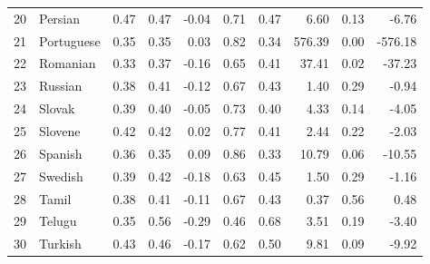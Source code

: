\documentclass[a4paper]{article}
\begin{document}
\begin{table}[hbtp]
\begin{tabular}{rlrrrrrrrr}
  20 & Persian & 0.47 & 0.47 & -0.04 & 0.71 & 0.47 & 6.60 & 0.13 & -6.76 \\ 
  21 & Portuguese & 0.35 & 0.35 & 0.03 & 0.82 & 0.34 & 576.39 & 0.00 & -576.18 \\ 
  22 & Romanian & 0.33 & 0.37 & -0.16 & 0.65 & 0.41 & 37.41 & 0.02 & -37.23 \\ 
  23 & Russian & 0.38 & 0.41 & -0.12 & 0.67 & 0.43 & 1.40 & 0.29 & -0.94 \\ 
  24 & Slovak & 0.39 & 0.40 & -0.05 & 0.73 & 0.40 & 4.33 & 0.14 & -4.05 \\ 
  25 & Slovene & 0.42 & 0.42 & 0.02 & 0.77 & 0.41 & 2.44 & 0.22 & -2.03 \\ 
  26 & Spanish & 0.36 & 0.35 & 0.09 & 0.86 & 0.33 & 10.79 & 0.06 & -10.55 \\ 
  27 & Swedish & 0.39 & 0.42 & -0.18 & 0.63 & 0.45 & 1.50 & 0.29 & -1.16 \\ 
  28 & Tamil & 0.38 & 0.41 & -0.11 & 0.67 & 0.43 & 0.37 & 0.56 & 0.48 \\ 
  29 & Telugu & 0.35 & 0.56 & -0.29 & 0.46 & 0.68 & 3.51 & 0.19 & -3.40 \\ 
  30 & Turkish & 0.43 & 0.46 & -0.17 & 0.62 & 0.50 & 9.81 & 0.09 & -9.92 \\ 
   \hline
\end{tabular}
\end{table}
\end{document}

